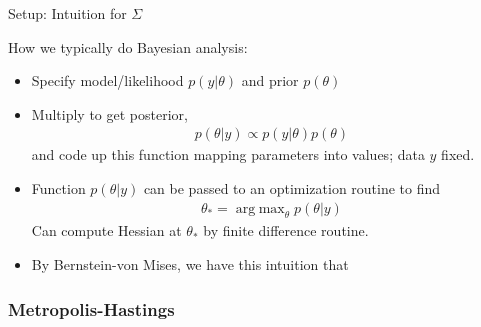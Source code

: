\documentclass[aspectratio=169, handout]{beamer}
\DeclareMathOperator*{\argmax}{arg\;max}
\begin{document}
{\footnotesize
\begin{frame}{Setup: Intuition for $\Sigma$}

How we typically do Bayesian analysis:
\begin{itemize}
  \vspace{-10pt}
  \item Specify model/likelihood $p(y|\theta)$
    and prior $p(\theta)$
  \item Multiply to get posterior,
    \vspace{-8pt}
    \begin{align*}
      p(\theta|y)\propto p(y|\theta)p(\theta)
    \end{align*}
    and code up this function mapping parameters into values;
    data $y$ fixed.
  \item
    Function $p(\theta|y)$ can be passed to an
    \alert{optimization routine} to find
    \begin{align*}
      \theta_*
      =\argmax_\theta p(\theta|y)
    \end{align*}
    Can compute Hessian at $\theta_*$ by finite difference routine.

  \item By Bernstein-von Mises, we have this intuition that
\end{itemize}
\end{frame}
}


\subsubsection{Metropolis-Hastings}
\end{document}
